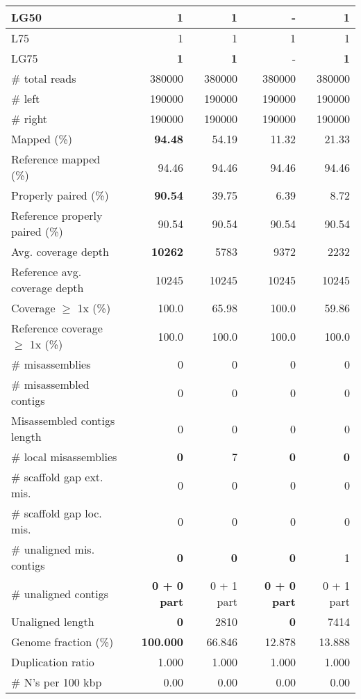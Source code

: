 \documentclass[12pt,a4paper]{article}
\begin{document}
\begin{table}[ht]
\begin{center}
\begin{tabular}{|l*{4}{|r}|}
LG50 & {\bf 1} & {\bf 1} & - & {\bf 1} \\ \hline
L75 & 1 & 1 & 1 & 1 \\ \hline
LG75 & {\bf 1} & {\bf 1} & - & {\bf 1} \\ \hline
\# total reads & 380000 & 380000 & 380000 & 380000 \\ \hline
\# left & 190000 & 190000 & 190000 & 190000 \\ \hline
\# right & 190000 & 190000 & 190000 & 190000 \\ \hline
Mapped (\%) & {\bf 94.48} & 54.19 & 11.32 & 21.33 \\ \hline
Reference mapped (\%) & 94.46 & 94.46 & 94.46 & 94.46 \\ \hline
Properly paired (\%) & {\bf 90.54} & 39.75 & 6.39 & 8.72 \\ \hline
Reference properly paired (\%) & 90.54 & 90.54 & 90.54 & 90.54 \\ \hline
Avg. coverage depth & {\bf 10262} & 5783 & 9372 & 2232 \\ \hline
Reference avg. coverage depth & 10245 & 10245 & 10245 & 10245 \\ \hline
Coverage $\geq$ 1x (\%) & 100.0 & 65.98 & 100.0 & 59.86 \\ \hline
Reference coverage $\geq$ 1x (\%) & 100.0 & 100.0 & 100.0 & 100.0 \\ \hline
\# misassemblies & 0 & 0 & 0 & 0 \\ \hline
\# misassembled contigs & 0 & 0 & 0 & 0 \\ \hline
Misassembled contigs length & 0 & 0 & 0 & 0 \\ \hline
\# local misassemblies & {\bf 0} & 7 & {\bf 0} & {\bf 0} \\ \hline
\# scaffold gap ext. mis. & 0 & 0 & 0 & 0 \\ \hline
\# scaffold gap loc. mis. & 0 & 0 & 0 & 0 \\ \hline
\# unaligned mis. contigs & {\bf 0} & {\bf 0} & {\bf 0} & 1 \\ \hline
\# unaligned contigs & {\bf 0 + 0 part} & 0 + 1 part & {\bf 0 + 0 part} & 0 + 1 part \\ \hline
Unaligned length & {\bf 0} & 2810 & {\bf 0} & 7414 \\ \hline
Genome fraction (\%) & {\bf 100.000} & 66.846 & 12.878 & 13.888 \\ \hline
Duplication ratio & 1.000 & 1.000 & 1.000 & 1.000 \\ \hline
\# N's per 100 kbp & 0.00 & 0.00 & 0.00 & 0.00 \\ \hline

\end{tabular}
\end{center}
\end{table}
\end{document}
